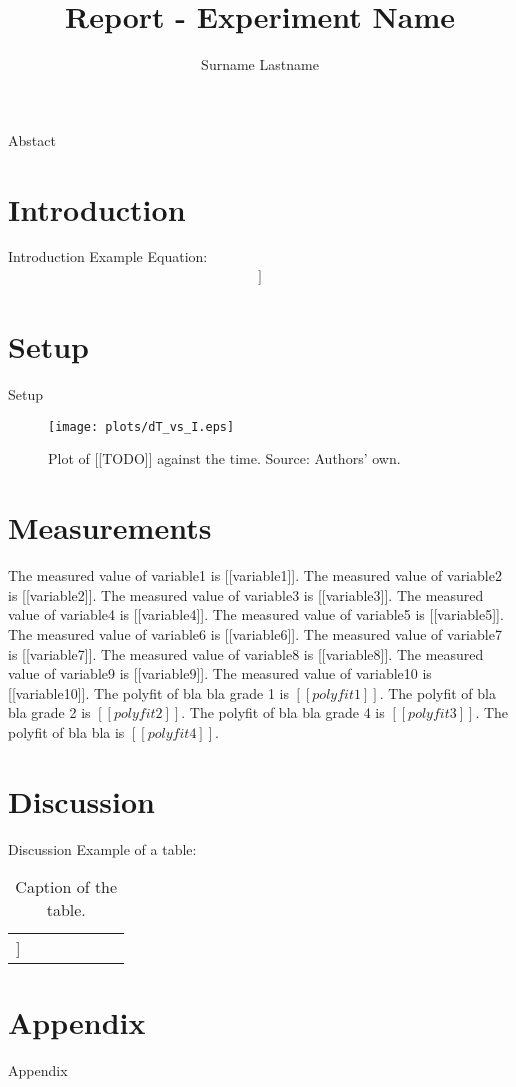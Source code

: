 \documentclass[a4paper]{article}
\author{Surname Lastname}
\title{Report - Experiment Name}
\begin{document}
\maketitle
\abstract 
Abstact
\section{Introduction}
Introduction
\newline
Example Equation:
\begin{align}
[[EQ1]]
\label{eq:Example Equation}
\end{align}
\section{Setup}
Setup

\begin{figure}[H]
\centering
\texttt{[image: plots/dT\_vs\_I.eps]}
\caption{Plot of [[TODO]] against the time. Source: Authors' own.}
\label{fig:text}
\end{figure}

\section{Measurements}
The measured value of variable1 is [[variable1]].
\newline
The measured value of variable2 is [[variable2]].
\newline
The measured value of variable3 is [[variable3]].
\newline
The measured value of variable4 is [[variable4]].
\newline
The measured value of variable5 is [[variable5]].
\newline
The measured value of variable6 is [[variable6]].
\newline
The measured value of variable7 is [[variable7]].
\newline
The measured value of variable8 is [[variable8]].
\newline
The measured value of variable9 is [[variable9]].
\newline
The measured value of variable10 is [[variable10]].
\newline
The polyfit of bla bla grade 1 is $[[polyfit1]]$.
\newline
The polyfit of bla bla grade 2 is $[[polyfit2]]$.
\newline
The polyfit of bla bla grade 4 is $[[polyfit3]]$.
\newline
The polyfit of bla bla is $[[polyfit4]]$.
\newline
\section{Discussion}
Discussion
Example of a table:

\begin{table}[H]
\centering
\begin{tabular}{r|rrrrrr}
\hline
[[table]]
\end{tabular}
\caption{Caption of the table.}
\end{table}

\section{Appendix}
Appendix
\end{document}
